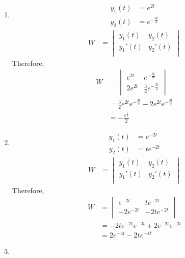 \documentclass[fleqn, a4paper, 11pt, oneside]{amsart}
\theoremstyle{definition}
\theoremstyle{theorem}
\begin{document}
\begin{solution}
	\begin{enumerate}[leftmargin = *]
		\item
			\begin{align*}
				y_1(t) & = e^{2 t} \\
				y_2(t) & = e^{-\frac{3 t}{2}}
			\end{align*}
			\begin{align*}
				W &=
					\begin{vmatrix}
						y_1(t)    & y_2(t)    \\
						{y_1}'(t) & {y_2}'(t) \\
					\end{vmatrix}
			\end{align*}
			Therefore,
			\begin{align*}
				W &=
					\begin{vmatrix}
						e^{2 t}   & e^{-\frac{3 t}{2}} \\
						2 e^{2 t} & \frac{3}{2} e^{-\frac{3 t}{2}}
					\end{vmatrix}\\
				  &= \frac{3}{2} e^{2 t} e^{-\frac{3 t}{2}} - 2 e^{2 t} e^{-\frac{3 t}{2}}\\
				  &= -\frac{e^{\frac{t}{2}}}{2}
			\end{align*}
		\item
			\begin{align*}
				y_1(t) & = e^{-2 t} \\
				y_2(t) & = t e^{-2 t}
			\end{align*}
			\begin{align*}
				W &=
					\begin{vmatrix}
						y_1(t)    & y_2(t)    \\
						{y_1}'(t) & {y_2}'(t) \\
					\end{vmatrix}
			\end{align*}
			Therefore,
			\begin{align*}
				W &=
					\begin{vmatrix}
						e^{-2 t}    & t e^{-2 t}    \\
						-2 e^{-2 t} & -2 t e^{-2 t} \\
					\end{vmatrix}\\
				  &= -2 t e^{-2 t} e^{-2 t} + 2 e^{-2 t} e^{-2 t}\\
				  &= 2 e^{-4 t} - 2 t e^{-4 t}
			\end{align*}
		\item

\end{enumerate}
\end{solution}
\end{document}
